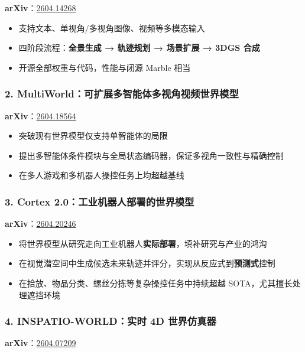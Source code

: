 \textbf{arXiv}：\href{https://arxiv.org/abs/2604.14268}{2604.14268}

\begin{itemize}[leftmargin=1.5em]
  \item 支持文本、单视角/多视角图像、视频等多模态输入
  \item 四阶段流程：\textbf{全景生成 → 轨迹规划 → 场景扩展 → 3DGS 合成}
  \item 开源全部权重与代码，性能与闭源 Marble 相当
\end{itemize}

\subsubsection{2. MultiWorld：可扩展多智能体多视角视频世界模型}

\textbf{arXiv}：\href{https://arxiv.org/abs/2604.18564}{2604.18564}

\begin{itemize}[leftmargin=1.5em]
  \item 突破现有世界模型仅支持单智能体的局限
  \item 提出多智能体条件模块与全局状态编码器，保证多视角一致性与精确控制
  \item 在多人游戏和多机器人操控任务上均超越基线
\end{itemize}

\subsubsection{3. Cortex 2.0：工业机器人部署的世界模型}

\textbf{arXiv}：\href{https://arxiv.org/abs/2604.20246}{2604.20246}

\begin{itemize}[leftmargin=1.5em]
  \item 将世界模型从研究走向工业机器人\textbf{实际部署}，填补研究与产业的鸿沟
  \item 在视觉潜空间中生成候选未来轨迹并评分，实现从反应式到\textbf{预测式}控制
  \item 在拾放、物品分类、螺丝分拣等复杂操控任务中持续超越 SOTA，尤其擅长处理遮挡环境
\end{itemize}

\subsubsection{4. INSPATIO-WORLD：实时 4D 世界仿真器}

\textbf{arXiv}：\href{https://arxiv.org/abs/2604.07209}{2604.07209}


